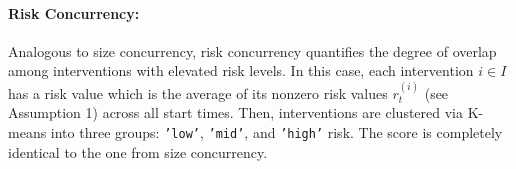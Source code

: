 
\paragraph{Risk Concurrency:} Analogous to size concurrency, risk concurrency quantifies the degree of overlap among interventions with elevated risk levels. In this case, each intervention \(i\in I\) has a risk value which is the average of its nonzero risk values $r_t^{(i)}$ (see Assumption 1) across all start times. Then, interventions are clustered via K-means into three groups: \texttt{'low'}, \texttt{'mid'}, and \texttt{'high'} risk. The score is completely identical to the one from size concurrency.


